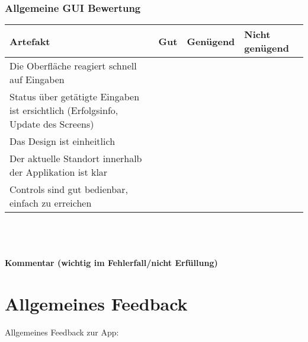 \documentclass[10pt,a4paper]{scrartcl}
\begin{document}
\subsubsection*{Allgemeine GUI Bewertung}
\begin{tabular}{|p{}|p{}|p{}|p{}|}
\hline 
\rule[-1ex]{0pt}{2.5ex} \textbf{Artefakt} & \textbf{Gut} & \textbf{Genügend} & \textbf{Nicht genügend} \\ 
\hline 
\rule[-1ex]{0pt}{2.5ex} Die Oberfläche reagiert schnell auf Eingaben &  &  &  \\ 
\hline 
\rule[-1ex]{0pt}{2.5ex} Status über getätigte Eingaben ist ersichtlich (Erfolgsinfo, Update des Screens) &  &  &  \\ 
\hline 
\rule[-1ex]{0pt}{2.5ex} Das Design ist einheitlich &  &  &  \\ 
\hline 
\rule[-1ex]{0pt}{2.5ex} Der aktuelle Standort innerhalb der Applikation ist klar &  &  &  \\ 
\hline 
\rule[-1ex]{0pt}{2.5ex} Controls sind gut bedienbar, einfach zu erreichen &  &  &  \\  
\hline 
\end{tabular} 
\\
\\
\\
\textbf{Kommentar (wichtig im Fehlerfall/nicht Erfüllung)}
\vspace*{3cm}



\newpage
\section{Allgemeines Feedback}
Allgemeines Feedback zur App:
\end{document}
